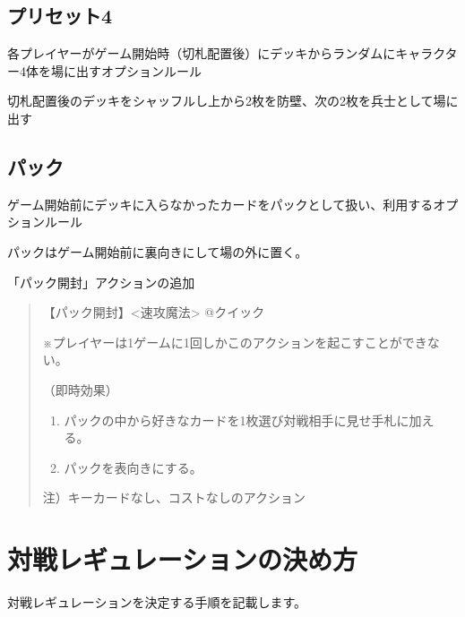 \documentclass[letterpaper,10pt,dvipdfmx]{sphinxmanual}
\begin{document}
\subsection{プリセット4}
\label{\detokenize{match-regulations/match-regulations:id10}}
\sphinxAtStartPar
各プレイヤーがゲーム開始時（切札配置後）にデッキからランダムにキャラクター4体を場に出すオプションルール

\sphinxAtStartPar
切札配置後のデッキをシャッフルし上から2枚を防壁、次の2枚を兵士として場に出す


\subsection{パック}
\label{\detokenize{match-regulations/match-regulations:id11}}
\sphinxAtStartPar
ゲーム開始前にデッキに入らなかったカードをパックとして扱い、利用するオプションルール

\sphinxAtStartPar
パックはゲーム開始前に裏向きにして場の外に置く。

\sphinxAtStartPar
「パック開封」アクションの追加
\begin{quote}

\sphinxAtStartPar
【パック開封】\textless{}速攻魔法\textgreater{} @クイック

\sphinxAtStartPar
※プレイヤーは1ゲームに1回しかこのアクションを起こすことができない。

\sphinxAtStartPar
（即時効果）
\begin{enumerate}
%
\item {} 
\sphinxAtStartPar
パックの中から好きなカードを1枚選び対戦相手に見せ手札に加える。

\item {} 
\sphinxAtStartPar
パックを表向きにする。

\end{enumerate}

\sphinxAtStartPar
注）キーカードなし、コストなしのアクション
\end{quote}


\section{対戦レギュレーションの決め方}
\label{\detokenize{match-regulations/match-regulations:id12}}
\sphinxAtStartPar
対戦レギュレーションを決定する手順を記載します。
\end{document}

